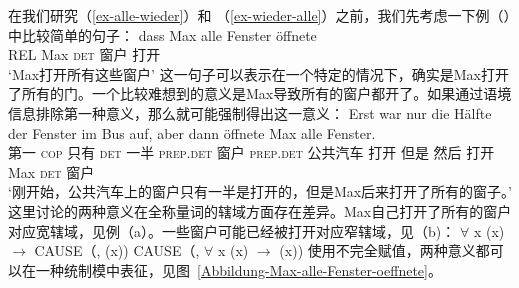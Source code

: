 \addlines
在我们研究（\ref{ex-alle-wieder}）和 （\ref{ex-wieder-alle}）之前，我们先考虑一下例（）中比较简单的句子：
\ea
\gll dass Max alle Fenster öffnete\\
	 REL Max \textsc{det} 窗户 打开\\
\glt `Max打开所有这些窗户'
\z
这一句子可以表示在一个特定的情况下，确实是Max打开了所有的门。一个比较难想到的意义是Max导致所有的窗户都开了。如果通过语境信息排除第一种意义，那么就可能强制得出这一意义\citep{Egg99a}：
\ea
\gll Erst war nur die Hälfte der Fenster im Bus auf, aber dann öffnete Max alle Fenster.\\
     第一 \textsc{cop} 只有 \textsc{det} 一半 \textsc{prep}.\textsc{det} 窗户 \textsc{prep}.\textsc{det} 公共汽车 打开 但是 然后 打开 Max \textsc{det} 窗户\\
\glt `刚开始，公共汽车上的窗户只有一半是打开的，但是Max后来打开了所有的窗子。'
\z
这里讨论的两种意义在全称量词的辖域方面存在差异。Max自己打开了所有的窗户对应宽辖域，见例（a）。一些窗户可能已经被打开对应窄辖域，见（b)：
\eal
\ex $\forall$ x (x) $\to$ CAUSE（, (x))
\ex CAUSE（, $\forall$ x (x) $\to$ (x))
\zl
使用不完全赋值，两种意义都可以在一种统制模中表征，见图~\vref{Abbildung-Max-alle-Fenster-oeffnete}。
